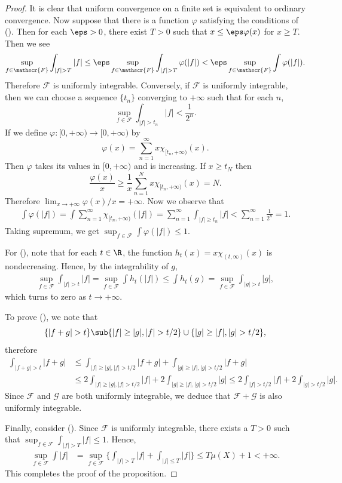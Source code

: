 \begin{proof}
It is clear that uniform convergence on a finite set is equivalent to ordinary convergence. Now suppose that there is a function $\varphi$ satisfying the conditions of (). Then for each $\eps>0$, there exist $T>0$ such that $x\leq\eps\varphi(x)$ for $x\geq T$. Then we see
\begin{align*}
\sup_{f\in\mathscr{F}}\int_{|f|>T}|f|\leq\eps\sup_{f\in\mathscr{F}}\int_{|f|>T}\varphi(|f|)<\eps\sup_{f\in\mathscr{F}}\int\varphi(|f|).
\end{align*}
Therefore $\mathscr{F}$ is uniformly integrable. Conversely, if $\mathscr{F}$ is uniformly integrable, then we can choose a sequence $\{t_n\}$ converging to $+\infty$ such that for each $n$,
\[\sup_{f\in\mathscr{F}}\int_{|f|>t_n}|f|<\frac{1}{2^n}.\]
If we define $\varphi:[0,+\infty)\to[0,+\infty)$ by
\[\varphi(x)=\sum_{n=1}^{\infty}x\chi_{[t_n,+\infty)}(x).\]
Then $\varphi$ takes its values in $[0,+\infty)$ and is increasing. If $x\geq t_N$ then
\[\frac{\varphi(x)}{x}\geq\frac{1}{x}\sum_{n=1}^{N}x\chi_{[t_n,+\infty)}(x)=N.\]
Therefore $\lim_{x\to+\infty}\varphi(x)/x=+\infty$. Now we observe that
\begin{align*}
\int\varphi(|f|)=\int\sum_{n=1}^{\infty}\chi_{[t_n,+\infty)}(|f|)=\sum_{n=1}^{\infty}\int_{|f|\geq t_n}|f|<\sum_{n=1}^{\infty}\frac{1}{2^n}=1.
\end{align*}
Taking supremum, we get $\sup_{f\in\mathscr{F}}\int\varphi(|f|)\leq 1$.\par
For (), note that for each $t\in\R$, the function $h_t(x)=x\chi_{(t,\infty)}(x)$ is nondecreasing. Hence, by the integrability of $g$,
\begin{align*}
\sup_{f\in\mathscr{F}}\int_{|f|>t}|f|=\sup_{f\in\mathscr{F}}\int h_t(|f|)\leq\int h_t(g)=\sup_{f\in\mathscr{F}}\int_{|g|>t}|g|,
\end{align*}
which turns to zero as $t\to+\infty$.\par
To prove (), we note that
\[\{|f+g|>t\}\sub\{|f|\geq |g|,|f|>t/2\}\cup\{|g|\geq|f|,|g|>t/2\},\]
therefore
\begin{align*}
\int_{|f+g|>t}|f+g|&\leq\int_{|f|\geq |g|,|f|>t/2}|f+g|+\int_{|g|\geq |f|,|g|>t/2}|f+g|\\
&\leq 2\int_{|f|\geq |g|,|f|>t/2}|f|+2\int_{|g|\geq |f|,|g|>t/2}|g|\leq 2\int_{|f|>t/2}|f|+2\int_{|g|>t/2}|g|.
\end{align*}
Since $\mathscr{F}$ and $\mathscr{G}$ are both uniformly integrable, we deduce that $\mathscr{F}+\mathscr{G}$ is also uniformly integrable.\par
Finally, consider (). Since $\mathscr{F}$ is uniformly integrable, there exists a $T>0$ such that $\sup_{f\in\mathscr{F}}\int_{|f|>T}|f|\leq 1$. Hence,
\begin{align*}
\sup_{f\in\mathscr{F}}\int|f|&=\sup_{f\in\mathscr{F}}\Big\{\int_{|f|>T}|f|+\int_{|f|\leq T}|f|\Big\}\leq T\mu(X)+1<+\infty.
\end{align*}
This completes the proof of the proposition.
\end{proof}
